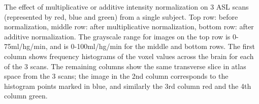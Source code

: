\label{fig:rgb_figure} The effect of multiplicative or additive intensity normalization on 3 ASL scans (represented by red, blue and green) from a single subject. Top row: before normalization, middle row: after multiplicative normalization, bottom row: after additive normalization. The grayscale range for images on the top row is 0-75ml/hg/min, and is 0-100ml/hg/min for the middle and bottom rows. The first column shows frequency histograms of the voxel values across the brain for each of the 3 scans. The remaining columns show the same transverse slice in atlas space from the 3 scans; the image in the 2nd column corresponds to the histogram points marked in blue, and similarly the 3rd column red and the 4th column green. 
